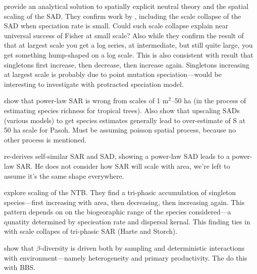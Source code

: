 \documentclass[12pt]{article}
\begin{document}
\citet{odwyer2017} provide an analytical solution to spatially
explicit neutral theory and the spatial scaling of the SAD. They
confirm work by \citet{rosindell2013}, including the scale collapse of
the SAD when speciation rate is small.  Could such scale collapse
explain near universal success of Fisher at small scale?  Also while
they confirm the result of \citet{rosindell2013} that at largest scale
you get a log series, at intermediate, but still quite large, you get
something hump-shaped on a log scale.  This is also consistent with
\citet{rosindell2013} result that singletons first increase, then
decrease, then increase again.  Singletons increasing at largest scale
is probably due to point mutation speciation---would be interesting to
investigate with protracted speciation model.

\citet{plotkin2000} show that power-law SAR is wrong from scales of 1
m$^2$--50 ha (in the process of estimating species richness for
tropical trees).  Also show that upscaling SADs (various models) to
get species estimates generally lead to over-estimate of S at 50 ha
scale for Pasoh.  Must be assuming poisson spatial process, because no
other process is mentioned.

\citet{pueyo2006} re-derives self-similar SAR and SAD, showing a
power-law SAD leads to a power-law SAR.  He does not consider how SAR
will scale with area, we're left to assume it's the same shape
everywhere.

\citet{rosindell2013} explore scaling of the NTB.  They find a
tri-phasic accumulation of singleton species---first increasing with
area, then decreasing, then increasing again.  This pattern depends on
on the biogeoraphic range of the species considered---a qunatity
determined by specieation rate and dispersal kernal.  This finding
ties in with scale collapes of tri-phasic SAR (Harte and Storch).

\citet{stegen2013} show that $\beta$-diversity is driven both by
sampling and deterministic interactions with environment---namely
heterogeneity and primary productivity.  The do this with BBS.




\end{document}
